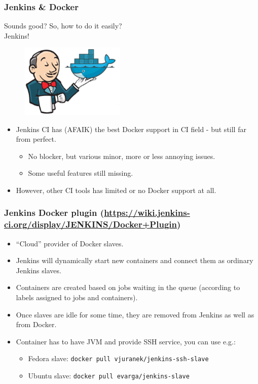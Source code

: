 \documentclass[10pt,utf8]{beamer}
\begin{document}
\begin{frame}
	\frametitle{Jenkins \& Docker}
	Sounds good? So, how to do it easily? \\ 
	Jenkins!
	\begin{figure}
		\centering
		\includegraphics[width=5cm]{./img/jenkins_docker.eps}
	\end{figure}
	\begin{itemize}
		\item Jenkins CI has (AFAIK) the best Docker support in CI field - but still far from perfect.
		\begin{itemize}
			\item No blocker, but various minor, more or less annoying issues.
			\item Some useful features still missing.
		\end{itemize}
		\item However, other CI tools has limited or no Docker support at all.
	\end{itemize}
\end{frame}

\begin{frame}
	\frametitle{Jenkins Docker plugin \scriptsize{(\href{https://wiki.jenkins-ci.org/display/JENKINS/Docker+Plugin}{https://wiki.jenkins-ci.org/display/JENKINS/Docker+Plugin})}}
	\begin{itemize}
		\item ``Cloud'' provider of Docker slaves.
		\item Jenkins will dynamically start new containers and connect them as ordinary Jenkins slaves.
		\item Containers are created based on jobs waiting in the queue (according to labels assigned to jobs and containers).
		\item Once slaves are idle for some time, they are removed from Jenkins as well as from Docker.
		\vspace{0.5cm}
		\item Container has to have JVM and provide SSH service, you can use e.g.:
		\begin{itemize}
			\item Fedora slave: \texttt{docker pull vjuranek/jenkins-ssh-slave} \\
				\href{https://registry.hub.docker.com/u/vjuranek/jenkins-ssh-slave/}{} 
			\item Ubuntu slave: \texttt{docker pull evarga/jenkins-slave} \\
				\href{https://registry.hub.docker.com/u/evarga/jenkins-slave/}{}
		\end{itemize}
  \end{itemize}
\end{frame}
\end{document}
